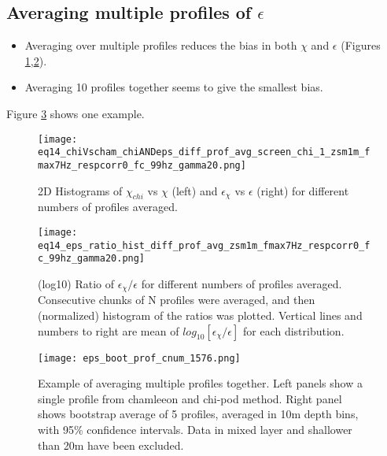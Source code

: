 \documentclass[11pt]{article}
\begin{document}
\subsection{Averaging multiple profiles of $\epsilon$}


\begin{itemize}

\item Averaging over multiple profiles reduces the bias in both $\chi$ and $\epsilon$ (Figures \ref{2Dhistdiffprof},\ref{histdiffprof}).

\item Averaging 10 profiles together seems to give the smallest bias.

\end{itemize}


Figure \ref{prof_avg_ex} shows one example. 


\begin{figure}[htbp]
\texttt{[image: eq14\_chiVscham\_chiANDeps\_diff\_prof\_avg\_screen\_chi\_1\_zsm1m\_fmax7Hz\_respcorr0\_fc\_99hz\_gamma20.png]}
\caption{2D Histograms of $\chi_{chi}$ vs $\chi$ (left) and $\epsilon_{\chi}$ vs $\epsilon$ (right) for different numbers of profiles averaged. }
\label{2Dhistdiffprof}
\end{figure}


\begin{figure}[htbp]
\texttt{[image: eq14\_eps\_ratio\_hist\_diff\_prof\_avg\_zsm1m\_fmax7Hz\_respcorr0\_fc\_99hz\_gamma20.png]}
\caption{(log10) Ratio of $\epsilon_{\chi}/\epsilon$ for different numbers of profiles averaged. Consecutive chunks of N profiles were averaged, and then (normalized) histogram of the ratios was plotted. Vertical lines and numbers to right are mean of $log_{10}[\epsilon_{\chi}/\epsilon]$ for each distribution. }
\label{histdiffprof}
\end{figure}


\begin{figure}[htbp]
\texttt{[image: eps\_boot\_prof\_cnum\_1576.png]}
\caption{Example of averaging multiple profiles together. Left panels show a single profile from chamleeon and chi-pod method. Right panel shows bootstrap average of 5 profiles, averaged in 10m depth bins, with 95\% confidence intervals. Data in mixed layer and shallower than 20m have been excluded.}
\label{prof_avg_ex}
\end{figure}




\clearpage
\end{document}

